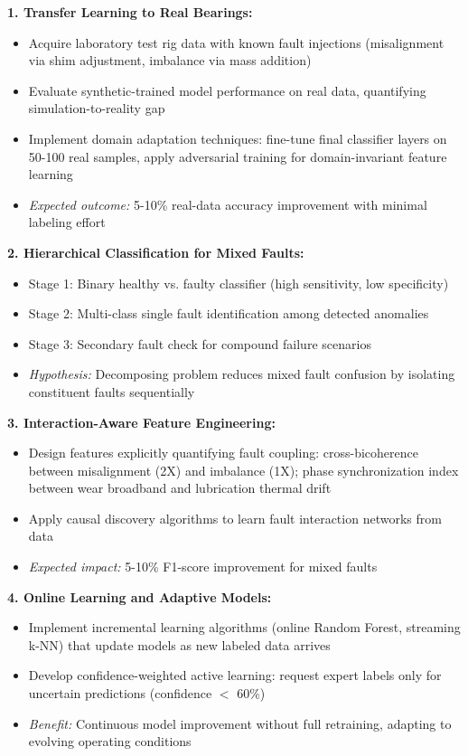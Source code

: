 \documentclass[11pt,a4paper]{article}
\begin{document}
\textbf{1. Transfer Learning to Real Bearings:}
\begin{itemize}[itemsep=0.3em]
    \item Acquire laboratory test rig data with known fault injections (misalignment via shim adjustment, imbalance via mass addition)
    \item Evaluate synthetic-trained model performance on real data, quantifying simulation-to-reality gap
    \item Implement domain adaptation techniques: fine-tune final classifier layers on 50-100 real samples, apply adversarial training for domain-invariant feature learning
    \item \textit{Expected outcome:} 5-10\% real-data accuracy improvement with minimal labeling effort
\end{itemize}

\textbf{2. Hierarchical Classification for Mixed Faults:}
\begin{itemize}[itemsep=0.3em]
    \item Stage 1: Binary healthy vs. faulty classifier (high sensitivity, low specificity)
    \item Stage 2: Multi-class single fault identification among detected anomalies
    \item Stage 3: Secondary fault check for compound failure scenarios
    \item \textit{Hypothesis:} Decomposing problem reduces mixed fault confusion by isolating constituent faults sequentially
\end{itemize}

\textbf{3. Interaction-Aware Feature Engineering:}
\begin{itemize}[itemsep=0.3em]
    \item Design features explicitly quantifying fault coupling: cross-bicoherence between misalignment (2X) and imbalance (1X); phase synchronization index between wear broadband and lubrication thermal drift
    \item Apply causal discovery algorithms to learn fault interaction networks from data
    \item \textit{Expected impact:} 5-10\% F1-score improvement for mixed faults
\end{itemize}

\textbf{4. Online Learning and Adaptive Models:}
\begin{itemize}[itemsep=0.3em]
    \item Implement incremental learning algorithms (online Random Forest, streaming k-NN) that update models as new labeled data arrives
    \item Develop confidence-weighted active learning: request expert labels only for uncertain predictions (confidence  $<$ 60\%)
    \item \textit{Benefit:} Continuous model improvement without full retraining, adapting to evolving operating conditions
\end{itemize}
\end{document}
